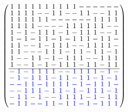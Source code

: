 \documentclass{beamer}
\newcommand{\bblue}[1]{\textcolor{blue}{#1}}
\begin{document}
\begin{frame}

  \[
    \arraycolsep=1.0pt\def\arraystretch{0.75}
    \left(
      \begin{array}{cccccccccccccccc}
        1&1&1&1&1&1&1&1&1&1&-&-&-&-&-&-\\
        1&1&1&1&-&-&1&1&-&-&1&1&-&-&1&1\\
        1&1&1&1&1&1&-&-&-&-&-&-&1&1&1&1\\
        1&1&1&1&-&-&-&-&1&1&1&1&1&1&-&-\\
        1&-&1&-&1&1&1&-&1&-&1&1&1&-&-&1\\
        1&-&1&-&1&1&-&1&-&1&1&1&-&1&1&-\\
        1&1&-&-&1&-&1&1&1&-&-&1&1&1&1&-\\
        1&1&-&-&-&1&1&1&-&1&1&-&1&1&-&1\\
        1&-&-&1&1&-&1&-&1&1&1&-&-&1&1&1\\
        1&-&-&1&-&1&-&1&1&1&-&1&1&-&1&1\\ \hline
        \bblue{-}&\bblue{1}&\bblue{-}&\bblue{1}&\bblue{1}&\bblue{1}&\bblue{1}&\bblue{-}&\bblue{-}&\bblue{1}&\bblue{1}&\bblue{1}&\bblue{1}&\bblue{-}&\bblue{1}&\bblue{-}\\
        \bblue{-}&\bblue{1}&\bblue{-}&\bblue{1}&\bblue{1}&\bblue{1}&\bblue{-}&\bblue{1}&\bblue{1}&\bblue{-}&\bblue{1}&\bblue{1}&\bblue{-}&\bblue{1}&\bblue{-}&\bblue{1}\\
        \bblue{-}&\bblue{-}&\bblue{1}&\bblue{1}&\bblue{-}&\bblue{1}&\bblue{1}&\bblue{1}&\bblue{1}&\bblue{-}&\bblue{1}&\bblue{-}&\bblue{1}&\bblue{1}&\bblue{1}&\bblue{-}\\
        \bblue{-}&\bblue{-}&\bblue{1}&\bblue{1}&\bblue{1}&\bblue{-}&\bblue{1}&\bblue{1}&\bblue{-}&\bblue{1}&\bblue{-}&\bblue{1}&\bblue{1}&\bblue{1}&\bblue{-}&\bblue{1}\\
        \bblue{-}&\bblue{1}&\bblue{1}&\bblue{-}&\bblue{1}&\bblue{-}&\bblue{-}&\bblue{1}&\bblue{1}&\bblue{1}&\bblue{1}&\bblue{-}&\bblue{1}&\bblue{-}&\bblue{1}&\bblue{1}\\
        \bblue{-}&\bblue{1}&\bblue{1}&\bblue{-}&\bblue{-}&\bblue{1}&\bblue{1}&\bblue{-}&\bblue{1}&\bblue{1}&\bblue{-}&\bblue{1}&\bblue{-}&\bblue{1}&\bblue{1}&\bblue{1}\\
      \end{array}
    \right)
  \]
  
\end{frame}

\end{document}
